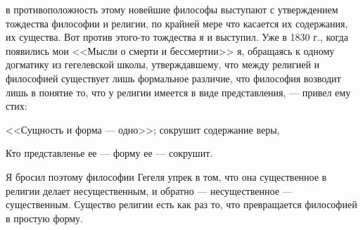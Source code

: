 \documentclass[12pt]{article}
\begin{document}
в противоположность этому новейшие философы выступают с утверждением тождества философии и религии, по крайней мере что касается их содержания, их существа. Вот против этого-то тождества я и выступил. Уже в 1830 г., когда появились мои <<Мысли о смерти и бессмертии>>  я, обращаясь к одному догматику из гегелевской школы, утверждавшему, что между религией и философией существует лишь формальное различие, что философия возводит лишь в понятие то, что у религии имеется в виде представления, --- привел ему стих: 

<<Сущность и форма --- одно>>; сокрушит содержание веры, 

Кто представленье ее --- форму ее --- сокрушит. 

Я бросил поэтому философии Гегеля упрек в том, что она существенное в религии делает несущественным, и обратно --- несущественное --- существенным. Существо религии есть как раз то, что превращается философией в простую форму. 
\end{document}
